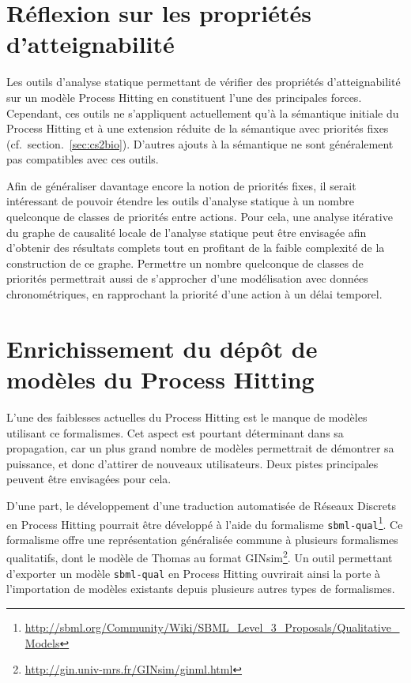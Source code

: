 \section{Réflexion sur les propriétés d'atteignabilité}

Les outils d'analyse statique permettant de vérifier des propriétés d'atteignabilité sur un modèle Process Hitting en constituent l'une des principales forces.
Cependant, ces outils ne s'appliquent actuellement qu'à la sémantique initiale du Process Hitting
et à une extension réduite de la sémantique avec priorités fixes (cf.~section.~\ref{sec:cs2bio}).
D'autres ajouts à la sémantique ne sont généralement pas compatibles avec ces outils.

Afin de généraliser davantage encore la notion de priorités fixes, il serait intéressant de pouvoir étendre les outils d'analyse statique à un nombre quelconque de classes de priorités entre actions.
Pour cela, une analyse itérative du graphe de causalité locale de l'analyse statique peut être envisagée afin d'obtenir des résultats complets tout en profitant de la faible complexité de la construction de ce graphe.
Permettre un nombre quelconque de classes de priorités permettrait aussi de s'approcher d'une modélisation avec données chronométriques,
en rapprochant la priorité d'une action à un délai temporel.



\section{Enrichissement du dépôt de modèles du Process Hitting}
L'une des faiblesses actuelles du Process Hitting est le manque de modèles utilisant ce formalismes.
Cet aspect est pourtant déterminant dans sa propagation, car un plus grand nombre de modèles permettrait de démontrer sa puissance, et donc d'attirer de nouveaux utilisateurs.
Deux pistes principales peuvent être envisagées pour cela.

D'une part, le développement d'une traduction automatisée de Réseaux Discrets en Process Hitting pourrait être développé à l'aide du formalisme \texttt{sbml-qual}\footnote{\url{http://sbml.org/Community/Wiki/SBML_Level_3_Proposals/Qualitative_Models}}.
Ce formalisme offre une représentation généralisée commune à plusieurs formalismes qualitatifs, dont le modèle de Thomas au format GINsim\footnote{\url{http://gin.univ-mrs.fr/GINsim/ginml.html}}.
Un outil permettant d'exporter un modèle \texttt{sbml-qual} en Process Hitting ouvrirait ainsi la porte à l'importation de modèles existants depuis plusieurs autres types de formalismes.

